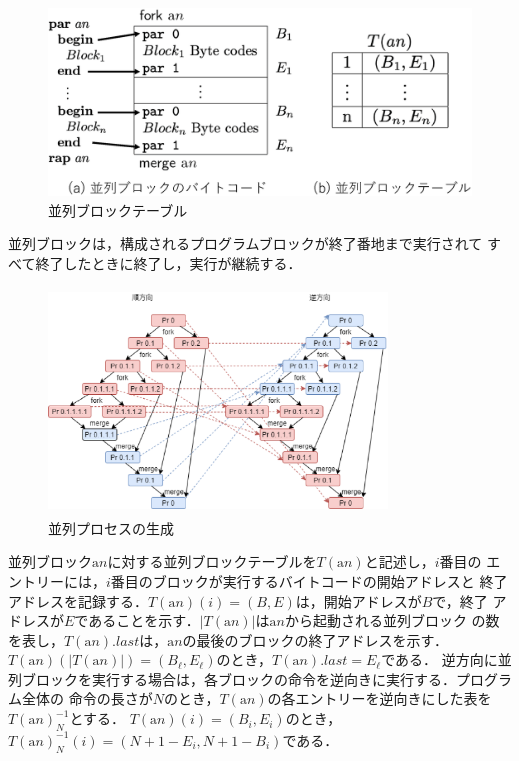 \documentclass[submit,PRO]{ipsj}
\newcommand{\alabel}[1]{\mathrm{a}#1}
\begin{document}
\begin{figure}[tb]
\includegraphics[width=.8\linewidth]{./parallelTable_1-r1.eps}
\caption{並列ブロックテーブル}
\label{fig:parallelTable}
\end{figure}

並列ブロックは，構成されるプログラムブロックが終了番地まで実行されて
すべて終了したときに終了し，実行が継続する．

\begin{figure}[tb]
\includegraphics[height=6.0cm,width=9.0cm]{./parallel.eps}
\caption{並列プロセスの生成}
\label{fig:parallel}
\end{figure}

並列ブロック$\alabel{n}$に対する並列ブロックテーブルを$T(\alabel{n})$と記述し，$i$番目の
エントリーには，$i$番目のブロックが実行するバイトコードの開始アドレスと
終了アドレスを記録する．$T(\alabel{n})(i)=(B,E)$は，開始アドレスが$B$で，終了
アドレスが$E$であることを示す．$|T(\alabel{n})|$は$\alabel{n}$から起動される並列ブロック
の数を表し，$T(\alabel{n}).last$は，$\alabel{n}$の最後のブロックの終了アドレスを示す．
$T(\alabel{n})(|T(\alabel{n})|)=(B_\ell,E_\ell)$のとき，$T(\alabel{n}).last=E_\ell$である．
逆方向に並列ブロックを実行する場合は，各ブロックの命令を逆向きに実行する．プログラム全体の
命令の長さが$N$のとき，$T(\alabel{n})$の各エントリーを逆向きにした表を$T(\alabel{n})^{-1}_N$とする．
$T(\alabel{n})(i)=(B_i,E_i)$のとき，$T(\alabel{n})^{-1}_N(i)=(N+1-E_i,N+1-B_i)$である．
\end{document}
